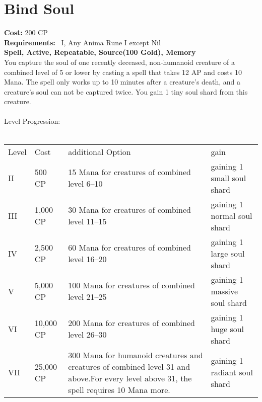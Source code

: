 \section{Bind Soul}
\textbf{Cost:} 200 CP\\
\textbf{Requirements:}~ I, Any Anima Rune I except Nil\\
\textbf{Spell, Active, Repeatable, Source(100 Gold), Memory}\\
You capture the soul of one recently deceased, non-humanoid creature of a combined level of 5 or lower by casting a spell that takes 12 AP and costs 10 Mana.
The spell only works up to 10 minutes after a creature's death, and a creature's soul can not be captured twice.
You gain 1 tiny soul shard from this creature.\\
\\
Level Progression:\\
\\
\begin{tabular}{l | l | p{5.5cm} | p{2.5cm}}
    Level & Cost & additional Option & gain\\
    II & 500 CP & 15 Mana for creatures of combined level 6--10 & gaining 1 small soul shard\\
    III & 1,000 CP & 30 Mana for creatures of combined level 11--15 & gaining 1 normal soul shard\\
    IV & 2,500 CP & 60 Mana for creatures of combined level 16--20 & gaining 1 large soul shard\\
    V & 5,000 CP & 100 Mana for creatures of combined level 21--25 & gaining 1 massive soul shard\\
    VI & 10,000 CP & 200 Mana for creatures of combined level 26--30 & gaining 1 huge soul shard\\
    VII & 25,000 CP & 300 Mana for humanoid creatures and creatures of combined level 31 and above.\linebreak For every level above 31, the spell requires 10 Mana more. & gaining 1 radiant soul shard\\
\end{tabular}